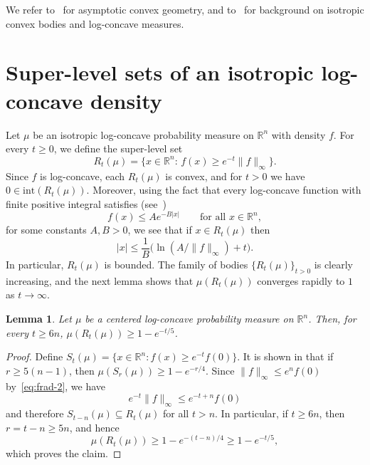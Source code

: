 \documentclass[11pt,leqno]{article}
\newtheorem{lemma}[theorem]{Lemma}
\theoremstyle{remark}
\numberwithin{equation}{section}
\newcommand{\ls}{\leqslant}
\newcommand{\gr}{\geqslant}
\begin{document}
We refer to~\cite{AGA-book,AGA-book-2} for asymptotic convex geometry, and to~\cite{BGVV-book} for background 
on isotropic convex bodies and log-concave measures.

\section{Super-level sets of an isotropic log-concave density}\label{section:3}

Let $\mu$ be an isotropic log-concave probability measure on $\mathbb{R}^n$ with density $f$. For every $t\gr 0$, we define the super-level set
$$R_t(\mu)=\{x\in\mathbb{R}^n:\, f(x)\gr e^{-t}\|f\|_{\infty}\}.$$
Since $f$ is log-concave, each $R_t(\mu)$ is convex, and for $t>0$ we have $0\in\mathrm{int}(R_t(\mu))$.
Moreover, using the fact that every log-concave function with finite positive integral satisfies (see~\cite[Lemma~2.2.1]{BGVV-book})
\begin{equation}\label{eq:A-B}
f(x)\ls A e^{-B|x|}
\qquad\text{for all } x\in\mathbb{R}^n,
\end{equation}
for some constants $A,B>0$, we see that if $x\in R_t(\mu)$ then
$$|x|\ls \frac{1}{B}\bigl(\ln(A/\|f\|_{\infty})+t\bigr).$$
In particular, $R_t(\mu)$ is bounded. The family of bodies $\{R_t(\mu)\}_{t>0}$ is clearly increasing, and the next lemma shows
that $\mu(R_t(\mu))$ converges rapidly to $1$ as $t\to \infty$.

\begin{lemma}\label{lem:rapid}Let $\mu$ be a centered log-concave probability measure on $\mathbb{R}^n$.
Then, for every $t\gr 6n$, $\mu(R_t(\mu ))\gr 1-e^{-t/5}$.
\end{lemma}

\begin{proof}Define $S_t(\mu)=\{x\in\mathbb{R}^n:f(x)\gr e^{-t}f(0)\}$. It is shown in \cite[Proposition~2.1]{Giannopoulos-Tziotziou-2025} that
if $r\gr 5(n-1)$, then $\mu(S_r(\mu))\gr 1-e^{-r/4}$. Since $\|f\|_{\infty}\ls e^nf(0)$ by~\eqref{eq:frad-2}, we have 
$$e^{-t}\|f\|_{\infty}\ls e^{-t+n}f(0)$$
and therefore $S_{t-n}(\mu)\subseteq R_t(\mu)$ for all $t>n$. In particular, if $t\gr 6n$, then $r=t-n\gr 5n$, and hence 
$$\mu(R_t(\mu))\gr 1-e^{-(t-n)/4}\gr 1-e^{-t/5},$$
which proves the claim.
\end{proof}
\end{document}
